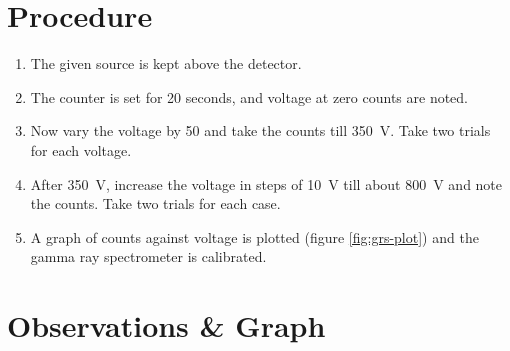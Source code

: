 \section{Procedure}
	
	\begin{enumerate}
		\item 	The given source is kept above the detector.
		\item 	The counter is set for 20 seconds, and voltage at zero counts are noted.
		
		\item 	Now vary the voltage by 50 and take the counts till \SI{350}{\volt}. Take two trials for each voltage.
		
		\item 	After \SI{350}{\volt}, increase the voltage in steps of \SI{10}{\volt} till about \SI{800}{\volt} and note the counts. Take two trials for each case.
		
		\item 	A graph of counts against voltage is plotted (figure \ref{fig:grs-plot}) and the gamma ray spectrometer is calibrated.
		
	\end{enumerate}		


\section{Observations \& Graph}

